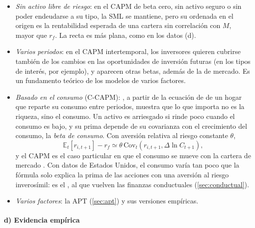 \documentclass[11pt]{article}
\begin{document}
\begin{itemize}
\item \emph{Sin activo libre de riesgo}: en el CAPM de beta cero\nocite{Black1972Restricted}, sin activo seguro o sin poder endeudarse a su tipo, la SML se mantiene, pero su ordenada en el origen es la rentabilidad esperada de una cartera sin correlación con $M$, mayor que $r_f$. La recta es más plana, como en los datos (d).
\item \emph{Varios periodos}: en el CAPM intertemporal\nocite{Merton1973ICAPM}, los inversores quieren cubrirse también de los cambios en las oportunidades de inversión futuras (en los tipos de interés, por ejemplo), y aparecen otras betas, además de la de mercado. Es un fundamento teórico de los modelos de varios factores.
\item \emph{Basado en el consumo} (C-CAPM): \textcite{Breeden1979Intertemporal}, a partir de la ecuación de  de un hogar que reparte su consumo entre periodos, muestra que lo que importa no es la riqueza, sino el consumo. Un activo es arriesgado si rinde poco cuando el consumo es bajo, y su prima depende de su covarianza con el crecimiento del consumo, la \emph{beta de consumo}. Con aversión relativa al riesgo constante $\theta$,
  \[
  \mathbb{E}_t[r_{i,t+1}]-r_f\simeq\theta\,\mathrm{Cov}_t\left(r_{i,t+1},\Delta\ln C_{t+1}\right),
  \]
  y el CAPM es el caso particular en que el consumo se mueve con la cartera de mercado . Con datos de Estados Unidos, el consumo varía tan poco que la fórmula solo explica la prima de las acciones con una aversión al riesgo inverosímil: es el \nocite{MehraPrescott1985Equity}, al que vuelven las finanzas conductuales (\ref{sec:conductual}).
\item \emph{Varios factores}: la APT (\ref{sec:apt}) y sus versiones empíricas.
\end{itemize}

\paragraph{d) Evidencia empírica}
\end{document}
